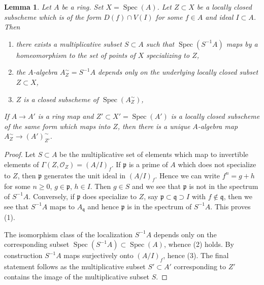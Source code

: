 \documentclass[10pt,a4paper]{amsart}
\theoremstyle{plain}
\newtheorem{lemma}[subsection]{Lemma}
\theoremstyle{definition}
\theoremstyle{remark}
\numberwithin{equation}{subsection}
\def\Spec{\mathop{\mathrm{Spec}}}
\begin{document}
\begin{lemma}
\label{lemma-localization}
Let $A$ be a ring. Set $X = \Spec(A)$. Let $Z \subset X$ be a locally closed
subscheme which is of the form $D(f) \cap V(I)$ for some $f \in A$ and
ideal $I \subset A$. Then
\begin{enumerate}
\item there exists a multiplicative subset $S \subset A$ such that
$\Spec(S^{-1}A)$ maps by a homeomorphism to the set of points of $X$
specializing to $Z$,
\item the $A$-algebra $A_Z^\sim = S^{-1}A$ depends only on
the underlying locally closed subset $Z \subset X$,
\item $Z$ is a closed subscheme of $\Spec(A_Z^\sim)$,
\end{enumerate}
If $A \to A'$ is a ring map and $Z' \subset X' = \Spec(A')$ is a
locally closed subscheme of the same form which maps into $Z$,
then there is a unique $A$-algebra map
$A_Z^\sim \to (A')_{Z'}^\sim$.
\end{lemma}

\begin{proof}
Let $S \subset A$ be the multiplicative set of elements which map
to invertible elements of $\Gamma(Z, \mathcal{O}_Z) = (A/I)_f$.
If $\mathfrak p$ is a prime of $A$ which does not specialize to $Z$,
then $\mathfrak p$ generates the unit ideal in $(A/I)_f$. Hence
we can write $f^n =  g + h$ for some $n \geq 0$, $g \in \mathfrak p$,
$h \in I$. Then $g \in S$ and we see that $\mathfrak p$ is not in
the spectrum of $S^{-1}A$. Conversely, if $\mathfrak p$ does specialize
to $Z$, say $\mathfrak p \subset \mathfrak q \supset I$ with
$f \not \in \mathfrak q$, then we see that $S^{-1}A$ maps to
$A_\mathfrak q$ and hence $\mathfrak p$ is in the spectrum of $S^{-1}A$.
This proves (1).

\medskip\noindent
The isomorphism class of the localization $S^{-1}A$ depends only
on the corresponding subset $\Spec(S^{-1}A) \subset \Spec(A)$, whence
(2) holds. By construction $S^{-1}A$ maps surjectively onto
$(A/I)_f$, hence (3). The final statement follows as the multiplicative subset
$S' \subset A'$ corresponding to $Z'$ contains the image of the
multiplicative subset $S$.
\end{proof}
\end{document}
